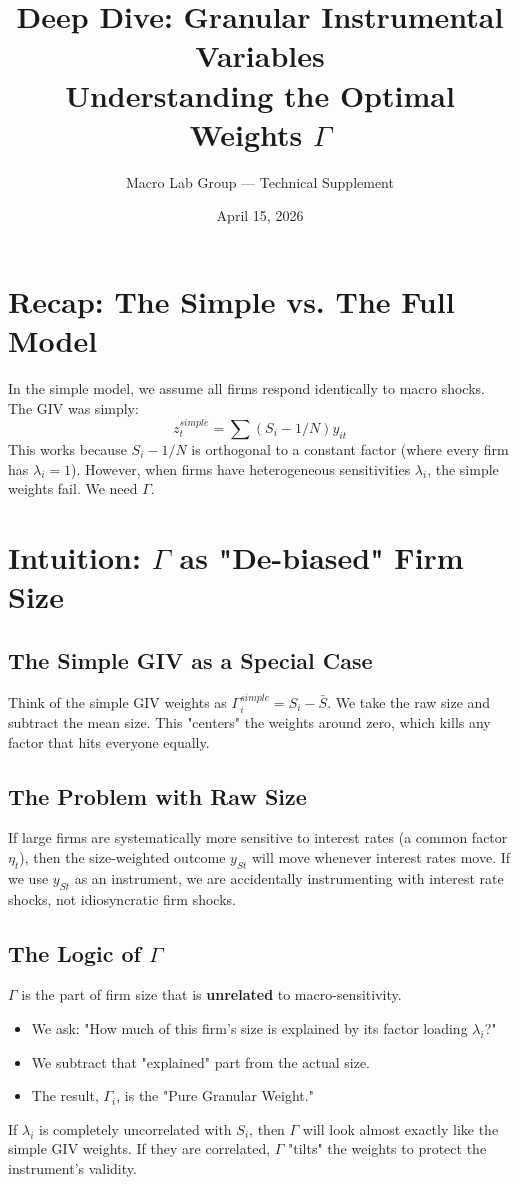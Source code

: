 \documentclass[11pt]{article}
\title{\color{DeepNavy}\huge Deep Dive: Granular Instrumental Variables\\ \large Understanding the Optimal Weights $\Gamma$}
\author{Macro Lab Group — Technical Supplement}
\date{April 15, 2026}
\begin{document}
\maketitle

\section{Recap: The Simple vs. The Full Model}
In the simple model, we assume all firms respond identically to macro shocks. The GIV was simply:
\begin{equation}
z_t^{simple} = \sum (S_i - 1/N) y_{it}
\end{equation}
This works because $S_i - 1/N$ is orthogonal to a constant factor (where every firm has $\lambda_i = 1$). However, when firms have heterogeneous sensitivities $\lambda_i$, the simple weights fail. We need $\Gamma$.

\section{Intuition: $\Gamma$ as "De-biased" Firm Size}

\subsection{The Simple GIV as a Special Case}
Think of the simple GIV weights as $\Gamma_i^{simple} = S_i - \bar{S}$. We take the raw size and subtract the mean size. This "centers" the weights around zero, which kills any factor that hits everyone equally.

\subsection{The Problem with Raw Size}
If large firms are systematically more sensitive to interest rates (a common factor $\eta_t$), then the size-weighted outcome $y_{St}$ will move whenever interest rates move. If we use $y_{St}$ as an instrument, we are accidentally instrumenting with interest rate shocks, not idiosyncratic firm shocks.

\subsection{The Logic of $\Gamma$}
$\Gamma$ is the part of firm size that is \textbf{unrelated} to macro-sensitivity.
\begin{itemize}
    \item We ask: "How much of this firm's size is explained by its factor loading $\lambda_i$?"
    \item We subtract that "explained" part from the actual size.
    \item The result, $\Gamma_i$, is the "Pure Granular Weight."
\end{itemize}
If $\lambda_i$ is completely uncorrelated with $S_i$, then $\Gamma$ will look almost exactly like the simple GIV weights. If they are correlated, $\Gamma$ "tilts" the weights to protect the instrument's validity.
\end{document}
